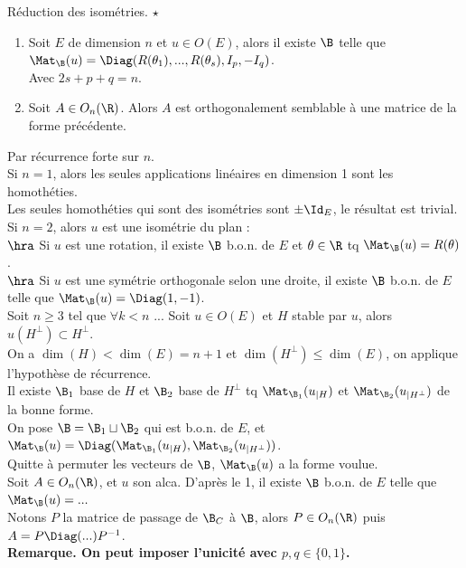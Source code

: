 \documentclass[11pt]{article}
\begin{document}
\begin{thm}{Réduction des isométries. $\star$}{}
    \begin{enumerate}
        \item Soit $E$ de dimension $n$ et $u\in O(E)$, alors il existe $\B$ telle que $\Mat_\B(u)=\Diag(R(\theta_1),...,R(\theta_s),I_p,-I_q)$.\\
        Avec $2s+p+q = n$.
        \item Soit $A\in O_n(\R)$. Alors $A$ est orthogonalement semblable à une matrice de la forme précédente.
    \end{enumerate}
    \tcblower
     Par récurrence forte sur $n$.\\
    Si $n=1$, alors les seules applications linéaires en dimension 1 sont les homothéties.\\
    Les seules homothéties qui sont des isométries sont $\pm\Id_E$, le résultat est trivial.\\
    Si $n=2$, alors $u$ est une isométrie du plan :\\
    $\hra$ Si $u$ est une rotation, il existe $\B$ b.o.n. de $E$ et $\theta\in\R$ tq $\Mat_\B(u)=R(\theta)$.\\
    $\hra$ Si $u$ est une symétrie orthogonale selon une droite, il existe $\B$ b.o.n. de $E$ telle que $\Mat_\B(u)=\Diag(1,-1)$.\\
    Soit $n\geq3$ tel que $\forall k < n$ ... Soit $u\in O(E)$ et $H$ stable par $u$, alors $u(H^\bot)\subset H^\bot$.\\
    On a $\dim(H)<\dim(E)=n+1$ et $\dim(H^\bot)\leq \dim(E)$, on applique l'hypothèse de récurrence.\\
    Il existe $\B_1$ base de $H$ et $\B_2$ base de $H^\bot$ tq $\Mat_{\B_1}(u_{|H})$ et $\Mat_{\B_2}(u_{|H^\bot})$ de la bonne forme.\\
    On pose $\B=\B_1\sqcup \B_2$ qui est b.o.n. de $E$, et $\Mat_\B(u)=\Diag(\Mat_{\B_1}(u_{|H}), \Mat_{\B_2}(u_{|H^\bot}))$.\\
    Quitte à permuter les vecteurs de $\B$, $\Mat_\B(u)$ a la forme voulue.\\
     Soit $A\in O_n(\R)$, et $u$ son alca. D'après le 1, il existe $\B$ b.o.n. de $E$ telle que $\Mat_\B(u)=...$\\
    Notons $P$ la matrice de passage de $\B_C$ à $\B$, alors $P\in O_n(\R)$ puis $A=P\Diag(...)P^{-1}$.\\
    \bf{Remarque.} On peut imposer l'unicité avec $p,q\in\{0,1\}$.
\end{thm}
\end{document}
